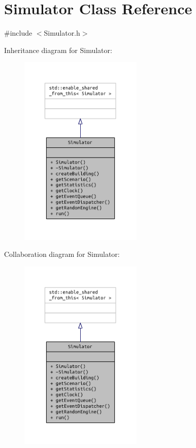 \section{Simulator Class Reference}
\label{class_simulator}


{\ttfamily \#include $<$Simulator.\+h$>$}



Inheritance diagram for Simulator\+:\nopagebreak
\begin{figure}[H]
\begin{center}
\leavevmode
\includegraphics[width=166pt]{class_simulator__inherit__graph}
\end{center}
\end{figure}


Collaboration diagram for Simulator\+:\nopagebreak
\begin{figure}[H]
\begin{center}
\leavevmode
\includegraphics[width=166pt]{class_simulator__coll__graph}
\end{center}
\end{figure}
